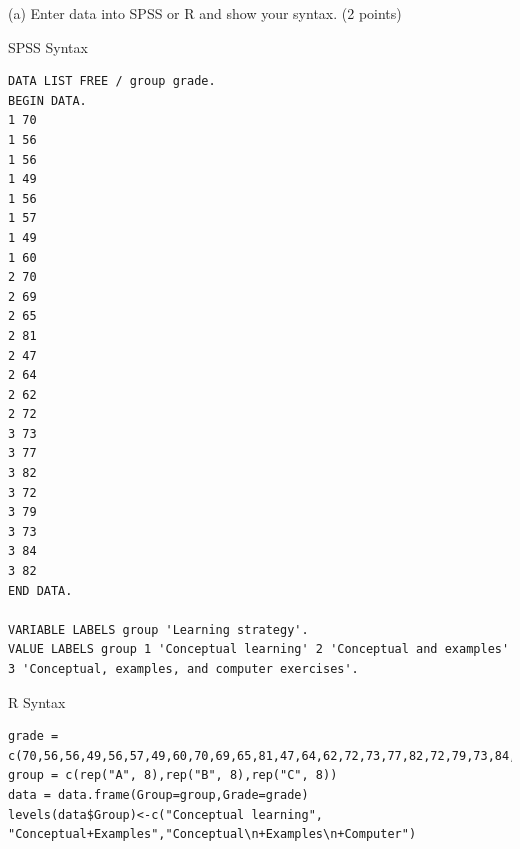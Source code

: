 \documentclass[11pt, oneside]{article}   	%
\begin{document}
(a) Enter data into SPSS or R and show your syntax. (2 points)

SPSS Syntax
\begin{lstlisting}[style=SPSSstyle]
DATA LIST FREE / group grade.
BEGIN DATA.
1 70
1 56
1 56
1 49
1 56
1 57
1 49
1 60
2 70
2 69
2 65
2 81
2 47
2 64
2 62
2 72
3 73
3 77
3 82
3 72
3 79
3 73
3 84
3 82
END DATA.

VARIABLE LABELS group 'Learning strategy'.
VALUE LABELS group 1 'Conceptual learning' 2 'Conceptual and examples' 
3 'Conceptual, examples, and computer exercises'.
\end{lstlisting}

R Syntax
\begin{lstlisting}[language=Rplus]
grade = c(70,56,56,49,56,57,49,60,70,69,65,81,47,64,62,72,73,77,82,72,79,73,84,82)
group = c(rep("A", 8),rep("B", 8),rep("C", 8))
data = data.frame(Group=group,Grade=grade)
levels(data$Group)<-c("Conceptual learning",
"Conceptual+Examples","Conceptual\n+Examples\n+Computer")
\end{lstlisting}
\end{document}

